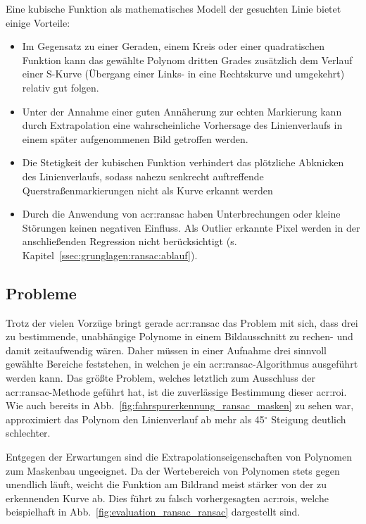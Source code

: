 Eine kubische Funktion als mathematisches Modell der gesuchten Linie bietet einige Vorteile:
\begin{itemize}
\item Im Gegensatz zu einer Geraden, einem Kreis oder einer quadratischen Funktion kann das gewählte Polynom dritten Grades zusätzlich dem Verlauf einer S-Kurve (Übergang einer Links- in eine Rechtskurve und umgekehrt) relativ gut folgen. 
\item Unter der Annahme einer guten Annäherung zur echten Markierung kann durch Extrapolation eine wahrscheinliche Vorhersage des Linienverlaufs in einem später aufgenommenen Bild getroffen werden. 
\item Die Stetigkeit der kubischen Funktion verhindert das plötzliche Abknicken des Linienverlaufs, sodass nahezu senkrecht auftreffende Querstraßenmarkierungen nicht als Kurve erkannt werden
\item Durch die Anwendung von \gls{acr:ransac} haben Unterbrechungen oder kleine Störungen keinen negativen Einfluss. Als Outlier erkannte Pixel werden in der anschließenden Regression nicht berücksichtigt (s. Kapitel~\ref{ssec:grunglagen:ransac:ablauf}).
\end{itemize}

\subsection{Probleme}
\label{ssec:evaluation:ransac:probleme}
Trotz der vielen Vorzüge bringt gerade \gls{acr:ransac} das Problem mit sich, dass drei zu bestimmende, unabhängige Polynome in einem Bildausschnitt zu rechen- und damit zeitaufwendig wären. Daher müssen in einer Aufnahme drei sinnvoll gewählte Bereiche feststehen, in welchen je ein \gls{acr:ransac}-Algorithmus ausgeführt werden kann. 
Das größte Problem, welches letztlich zum Ausschluss der \gls{acr:ransac}-Methode geführt hat, ist die zuverlässige Bestimmung dieser \gls{acr:roi}. Wie auch bereits in Abb.~\ref{fig:fahrspurerkennung_ransac_masken} zu sehen war, approximiert das Polynom den Linienverlauf ab mehr als 45\(^\circ\) Steigung deutlich schlechter. 

Entgegen der Erwartungen sind die Extrapolationseigenschaften von Polynomen zum Maskenbau ungeeignet. Da der Wertebereich von Polynomen stets gegen unendlich läuft, weicht die Funktion am Bildrand meist stärker von der zu erkennenden Kurve ab. Dies führt zu falsch vorhergesagten \glspl{acr:roi}, welche beispielhaft in Abb.~\ref{fig:evaluation_ransac_ransac} dargestellt sind.

